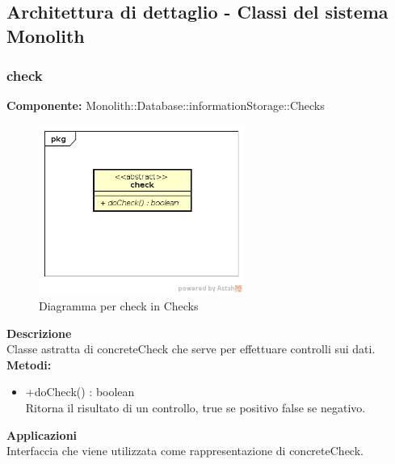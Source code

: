 \clearpage

\subsection{Architettura di dettaglio - Classi del sistema Monolith}\subsubsection{check}
\textbf{Componente:}  Monolith::Database::informationStorage::Checks\\
   \FloatBarrier
   \begin{figure}[ht]
   \centering
   \includegraphics[width=0.6\textwidth]{img/single-check}
   \caption{{Diagramma per check in Checks}}
\end{figure}
\FloatBarrier
\textbf{Descrizione}\\
Classe astratta di concreteCheck che serve per effettuare controlli sui dati.
\textbf{Metodi:}
\begin{itemize}\item +doCheck() : boolean \\Ritorna il risultato di un controllo, true se positivo false se negativo.\end{itemize} 


\textbf{Applicazioni}\\
Interfaccia che viene utilizzata come rappresentazione di concreteCheck. 


\clearpage


